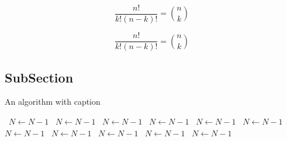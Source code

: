 \documentclass[a4paper]{article}
\begin{document}
\[ \frac{n!}{k!(n-k)!} = \binom{n}{k} \]

\[ \frac{n!}{k!(n-k)!} = \binom{n}{k} \]

\subsection{SubSection}

\begin{algorithm}
\caption{An algorithm with caption}
\begin{algorithmic}
\    \State $N \gets N - 1$
\    \State $N \gets N - 1$
\    \State $N \gets N - 1$
\    \State $N \gets N - 1$
\    \State $N \gets N - 1$
\    \State $N \gets N - 1$
\    \State $N \gets N - 1$
\    \State $N \gets N - 1$
\    \State $N \gets N - 1$
\    \State $N \gets N - 1$
\    \State $N \gets N - 1$
\EndWhile
\end{algorithmic}
\end{algorithm}
\end{document}
